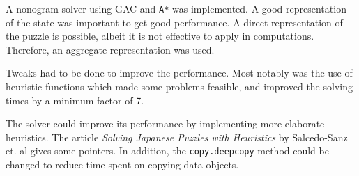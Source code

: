 A nonogram solver using GAC and \texttt{A*} was implemented. A good representation of the
state was important to get good performance. A direct representation of the puzzle
is possible, albeit it is not effective to apply in computations. Therefore, an aggregate representation was used.

Tweaks had to be done to improve the performance. Most notably was the use of heuristic functions which made some 
problems feasible, and improved the solving times by a minimum factor of 7.

The solver could improve its performance by implementing more elaborate heuristics. The article
\textit{Solving Japanese Puzzles with Heuristics} by Salcedo-Sanz et. al gives some pointers. 
In addition, the \texttt{copy.deepcopy} method could be changed to reduce time spent on copying data objects.   




